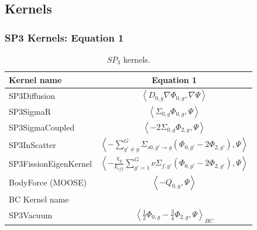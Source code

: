\subsection{Kernels}
\begin{frame}
\frametitle{SP3 Kernels: Equation 1}

\begin{table}[htbp!]
  \centering
  \caption{$SP_3$ kernels.}
  \begin{tabular}{lc}
  \toprule
  Kernel name           & Equation 1 \\
  \midrule
  SP3Diffusion           & $\left< D_{0,g} \nabla \Phi_{0,g}, \nabla \Psi \right>$ \\
  SP3SigmaR              & $\left< \Sigma_{0,g} \Phi_{0,g}, \Psi \right>$ \\
  SP3SigmaCoupled        & $\left< - 2 \Sigma_{0,g} \Phi_{2,g}, \Psi \right>$ \\
  SP3InScatter           & $\left< - \sum_{g'\ne g}^G \Sigma_{s0,g' \rightarrow g} \left( \Phi_{0,g'} - 2 \Phi_{2,g'} \right), \Psi \right>$ \\
  SP3FissionEigenKernel  & $\left< - \frac{\chi_g}{k_{eff}} \sum_{g'=1}^G \nu\Sigma_{f,g'} \left( \Phi_{0,g'} - 2 \Phi_{2,g'} \right), \Psi \right>$ \\
  BodyForce (MOOSE)      & $\left< - Q_{0,g}, \Psi \right>$ \\
  \midrule
  BC Kernel name & \\
  \midrule
  SP3Vacuum          & $\left< \frac{1}{2} \Phi_{0,g} - \frac{3}{4} \Phi_{2,g}, \Psi \right>_{BC}$ \\
  \bottomrule
  \end{tabular}
\end{table}
\end{frame}


